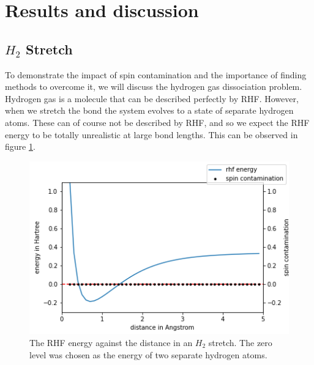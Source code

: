 \documentclass[twoside,twocolumn,9pt]{article}
\begin{document}
\section{Results and discussion}
\label{sec:results}

\subsection{$H_2$ Stretch}
\label{subsec:h2}
To demonstrate the impact of spin contamination and the importance of finding methods to overcome it, we will discuss the hydrogen gas dissociation problem\cite{Szabo1996}. Hydrogen
gas is a molecule that can be described perfectly by RHF. However, when we stretch the bond the system evolves to a state of separate hydrogen atoms. These can of course not be
described by RHF, and so we expect the RHF energy to be totally unrealistic at large bond lengths. This can be observed in figure \ref{fig:rhfstretch}.

\begin{center}
  \begin{figure}[h]
    \includegraphics[width=\linewidth]{./../notes/figures/rhf.png}
    \caption{The RHF energy against the distance in an $H_2$ stretch. The zero level was chosen as the energy of two separate hydrogen atoms.}
    \label{fig:rhfstretch}
  \end{figure}
\end{center}
\end{document}
